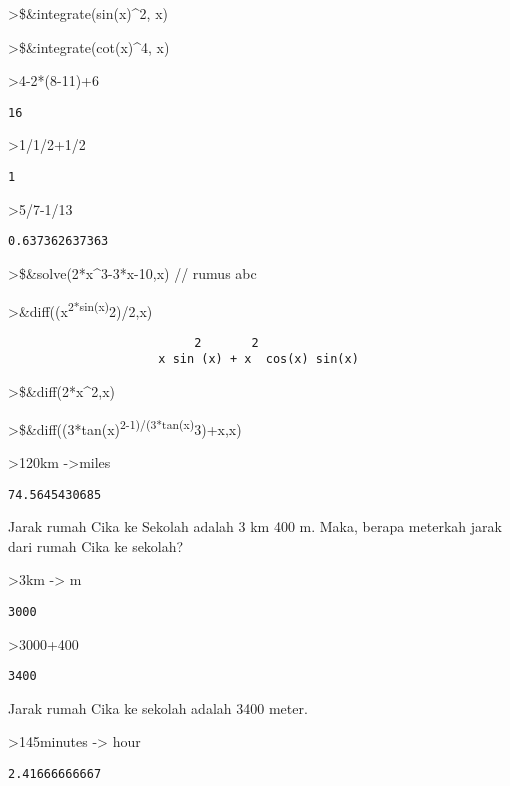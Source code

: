 \documentclass[
]{book}
\begin{document}
\textgreater\$\&integrate(sin(x)\^{}2, x)

\textgreater\$\&integrate(cot(x)\^{}4, x)

\textgreater4-2*(8-11)+6

\begin{verbatim}
16
\end{verbatim}

\textgreater1/1/2+1/2

\begin{verbatim}
1
\end{verbatim}

\textgreater5/7-1/13

\begin{verbatim}
0.637362637363
\end{verbatim}

\textgreater\$\&solve(2*x\^{}3-3*x-10,x) // rumus abc

\textgreater\&diff((x\textsuperscript{2*sin(x)}2)/2,x)

\begin{verbatim}
                          2       2
                     x sin (x) + x  cos(x) sin(x)
\end{verbatim}

\textgreater\$\&diff(2*x\^{}2,x)

\textgreater\$\&diff((3*tan(x)\textsuperscript{2-1)/(3*tan(x)}3)+x,x)

\textgreater120km -\textgreater miles

\begin{verbatim}
74.5645430685
\end{verbatim}

Jarak rumah Cika ke Sekolah adalah 3 km 400 m. Maka, berapa meterkah jarak dari rumah Cika ke sekolah?

\textgreater3km -\textgreater{} m

\begin{verbatim}
3000
\end{verbatim}

\textgreater3000+400

\begin{verbatim}
3400
\end{verbatim}

Jarak rumah Cika ke sekolah adalah 3400 meter.

\textgreater145minutes -\textgreater{} hour

\begin{verbatim}
2.41666666667
\end{verbatim}

\backmatter
\end{document}
